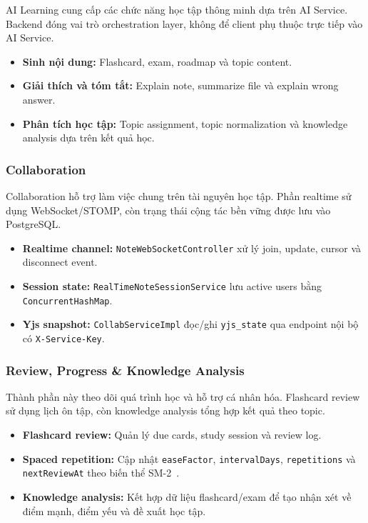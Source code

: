 AI Learning cung cấp các chức năng học tập thông minh dựa trên AI Service. Backend đóng vai trò orchestration layer, không để client phụ thuộc trực tiếp vào AI Service.

\begin{itemize}
    \item \textbf{Sinh nội dung:} Flashcard, exam, roadmap và topic content.
    \item \textbf{Giải thích và tóm tắt:} Explain note, summarize file và explain wrong answer.
    \item \textbf{Phân tích học tập:} Topic assignment, topic normalization và knowledge analysis dựa trên kết quả học.
\end{itemize}

\subsubsection{Collaboration}
\label{subsubsec:collaboration-component}

Collaboration hỗ trợ làm việc chung trên tài nguyên học tập. Phần realtime sử dụng WebSocket/STOMP, còn trạng thái cộng tác bền vững được lưu vào PostgreSQL.

\begin{itemize}
    \item \textbf{Realtime channel:} \texttt{NoteWebSocketController} xử lý join, update, cursor và disconnect event.
    \item \textbf{Session state:} \texttt{RealTimeNoteSessionService} lưu active users bằng \texttt{ConcurrentHashMap}.
    \item \textbf{Yjs snapshot:} \texttt{CollabServiceImpl} đọc/ghi \texttt{yjs\_state} qua endpoint nội bộ có \texttt{X-Service-Key}.
\end{itemize}

\subsubsection{Review, Progress \& Knowledge Analysis}
\label{subsubsec:review-progress-component}

Thành phần này theo dõi quá trình học và hỗ trợ cá nhân hóa. Flashcard review sử dụng lịch ôn tập, còn knowledge analysis tổng hợp kết quả theo topic.

\begin{itemize}
    \item \textbf{Flashcard review:} Quản lý due cards, study session và review log.
    \item \textbf{Spaced repetition:} Cập nhật \texttt{easeFactor}, \texttt{intervalDays}, \texttt{repetitions} và \texttt{nextReviewAt} theo biến thể SM-2~\cite{supermemo_sm2}.
    \item \textbf{Knowledge analysis:} Kết hợp dữ liệu flashcard/exam để tạo nhận xét về điểm mạnh, điểm yếu và đề xuất học tập.
\end{itemize}

